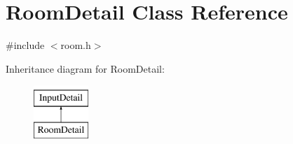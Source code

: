 \hypertarget{classRoomDetail}{\section{\-Room\-Detail \-Class \-Reference}
\label{d4/de5/classRoomDetail}
}


{\ttfamily \#include $<$room.\-h$>$}

\-Inheritance diagram for \-Room\-Detail\-:\begin{figure}[H]
\begin{center}
\leavevmode
\includegraphics[height=2.000000cm]{d4/de5/classRoomDetail}
\end{center}
\end{figure}
